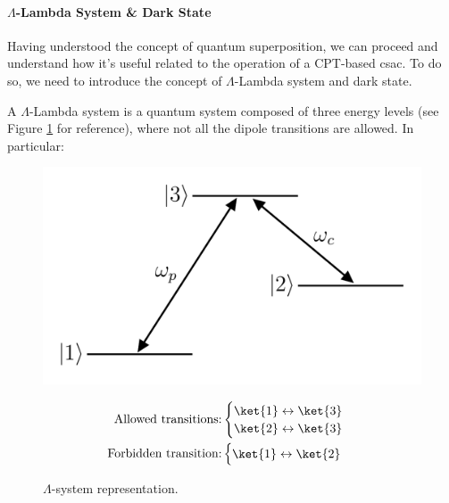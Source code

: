 \paragraph{$\Lambda$-Lambda System \& Dark State}

Having understood the concept of quantum superposition, we can proceed and understand how it's useful related to the operation of a CPT-based \acrshort{csac}.
To do so, we need to introduce the concept of $\Lambda$-Lambda system and dark state.

A $\Lambda$-Lambda system is a quantum system composed of three energy levels (see Figure \ref{fig:lambda-system} for reference), where not all the dipole transitions are allowed.
In particular:

\begin{figure}[H]
    \centering

    \begin{minipage}[c]{0.49\linewidth}
        \centering
        \includegraphics[width=\textwidth, max width=\linewidth]{pdf/lambda-system.pdf}
        \caption{$\Lambda$-system representation.}
        \label{fig:lambda-system}
    \end{minipage}
    \hfill
    \begin{minipage}[c]{0.49\linewidth}
        \begin{align}
            \text{Allowed transitions:}  & \begin{cases}
                                               \ket{1} \leftrightarrow \ket{3} \\
                                               \ket{2} \leftrightarrow \ket{3}
                                           \end{cases} \\
            \text{Forbidden transition:} & \begin{cases}
                                               \ket{1} \leftrightarrow \ket{2}
                                           \end{cases}
        \end{align}
    \end{minipage}

\end{figure}


